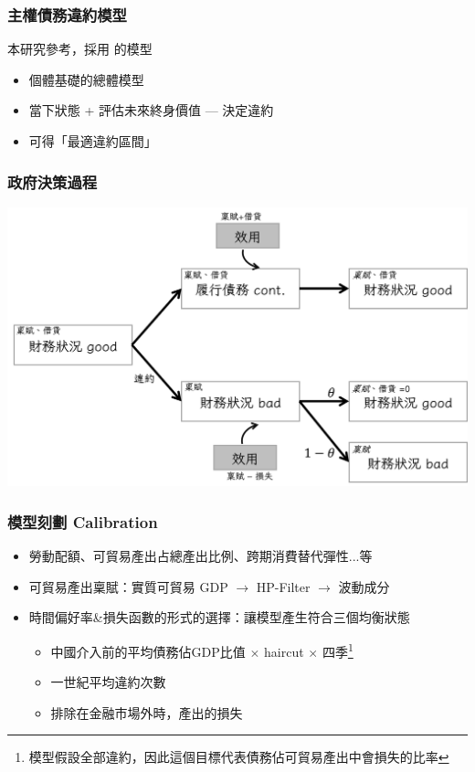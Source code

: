 \documentclass[mathserif]{beamer}
\begin{document}
    \begin{frame}
        \frametitle{主權債務違約模型}
        本研究參考\citet{Hinrichsen_2020-chapter4}，採用 \citet{Na-18} 的模型
        \begin{itemize}
            \item 個體基礎的總體模型
            \item 當下狀態 + 評估未來終身價值 --- 決定違約
            \item 可得「最適違約區間」
        \end{itemize}
    \end{frame}

    \begin{frame}
        \frametitle{政府決策過程}
        \includegraphics[width = \textwidth]{fig/value_fucntion_flow.png}
    \end{frame}

    \begin{frame}
        \frametitle{模型刻劃 Calibration}
        \begin{itemize}[<+->]
            \item 勞動配額、可貿易產出占總產出比例、跨期消費替代彈性...等
            \item 可貿易產出稟賦：實質可貿易 GDP $\rightarrow$ HP-Filter $\rightarrow$ 波動成分
            \item 時間偏好率\&損失函數的形式的選擇：讓模型產生符合三個均衡狀態
            \begin{itemize}
                \item 中國介入前的平均債務佔GDP比值 $\times$ haircut $\times$ 四季\footnote{模型假設全部違約，因此這個目標代表債務佔可貿易產出中會損失的比率}
                \item 一世紀平均違約次數
                \item 排除在金融市場外時，產出的損失
            \end{itemize}
        \end{itemize}
    \end{frame}
\end{document}
